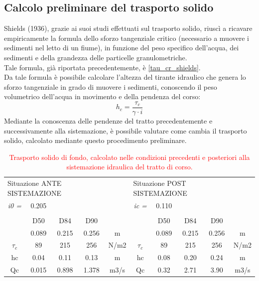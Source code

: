 \subsection{Calcolo preliminare del trasporto solido}
Shields (1936), grazie ai suoi studi effettuati sul trasporto solido, riuscì a ricavare empiricamente la formula dello sforzo tangenziale critico (necessario a muovere i sedimenti nel letto di un fiume), in funzione del peso specifico dell'acqua, dei sedimenti e della grandezza delle particelle granulometriche.\\
Tale formula, già riportata precedentemente, è \ref{tau_cr_shields}.\\
Da tale formula è possibile calcolare l'altezza del tirante idraulico che genera lo sforzo tangenziale in grado di muovere i sedimenti, conoscendo il peso volumetrico dell'acqua in movimento e della pendenza del corso:
\begin{equation}
    h_c = \frac{\tau_c}{\gamma \cdot i} 
\end{equation}
Mediante la conoscenza delle pendenze del tratto precedentemente e successivamente alla sistemazione, è possibile valutare come cambia il trasporto solido, calcolato mediante questo procedimento preliminare.\\

\begin{table}[H]
    \caption{\textcolor{red}{Trasporto solido di fondo, calcolato nelle condizioni precedenti e posteriori alla sistemazione idraulica del tratto di corso.}}
    \begin{tabular}{cccccccccc}
    \multicolumn{4}{l}{Situazione ANTE SISTEMAZIONE} &      & \multicolumn{4}{l}{Situazione POST SISTEMAZIONE} &      \\
    \textit{i0 =}  & 0.205  & \textbf{}  & \textbf{} &      & \textit{ic =}  & 0.110  & \textbf{}  & \textbf{} &      \\
                   &        &            &           &      &                &        &            &           &      \\
                   & D50    & D84        & D90       &      &                & D50    & D84        & D90       &      \\
                   & 0.089  & 0.215      & 0.256     & m    &                & 0.089  & 0.215      & 0.256     & m    \\
    $\tau_c$            & 89     & 215        & 256       & N/m2 & $\tau_c$       & 89     & 215        & 256       & N/m2 \\
    hc            & 0.04   & 0.11       & 0.13      & m    & hc         & 0.08   & 0.20       & 0.24      & m    \\
    Qc& 0.015  & 0.898      & 1.378     & m3/s & Qc & 0.32   & 2.71       & 3.90  & m3/s
    \end{tabular}
    \end{table}